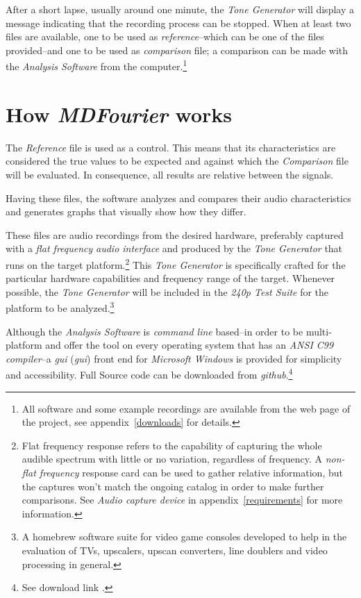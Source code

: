 \documentclass[10pt,a4paper]{report}
\newcommand{\define}[1]{\textit{\acrlong{#1}} (\textit{\acrshort{#1}})}
\begin{document}
After a short lapse, usually around one minute, the \textit{Tone Generator} will display a message indicating that the recording process can be stopped. When at least two files are available, one to be used as \textit{reference}--which can be one of the files provided--and one to be used as \textit{comparison} file; a comparison can be made with the \textit{Analysis Software} from the computer.\footnote{All software and some example recordings are available from the web page of the project, see appendix~\ref{downloads} for details.}

\section{How \textit{MDFourier} works}

The \textit{Reference} file is used as a control. This means that its characteristics are considered the true values to be expected and against which the \textit{Comparison} file will be evaluated. In consequence, all results are relative between the signals.

Having these files, the software analyzes and compares their audio characteristics and generates graphs that visually show how they differ.

These files are audio recordings from the desired hardware, preferably captured with a \textit{flat frequency} \textit{audio interface} and produced by the \textit{Tone Generator} that runs on the target platform.\footnote{Flat frequency response refers to the capability of capturing the whole audible spectrum with little or no variation, regardless of frequency. A \textit{non-flat frequency} response card can be used to gather relative information, but the captures won't match the ongoing catalog in order to make further comparisons. See \textit{Audio capture device} in appendix~\ref{requirements} for more information.} This \textit{Tone Generator} is specifically crafted for the particular hardware capabilities and frequency range of the target. Whenever possible, the \textit{Tone Generator} will be included in the \textit{240p Test Suite} for the platform to be analyzed.\footnote{A homebrew software suite for video game consoles developed to help in the evaluation of TVs, upscalers, upscan converters, line doublers and video processing in general.\cite{240pSuite}}

Although the \textit{Analysis Software} is \textit{command line} based--in order to be multi-platform and offer the tool on every operating system that has an \textit{ANSI C99 compiler}--a \define{gui} front end for \textit{Microsoft Windows} is provided for simplicity and accessibility. Full Source code can be downloaded from \textit{github}.\footnote{See download link \cite{sourcecode}.}
\end{document}
